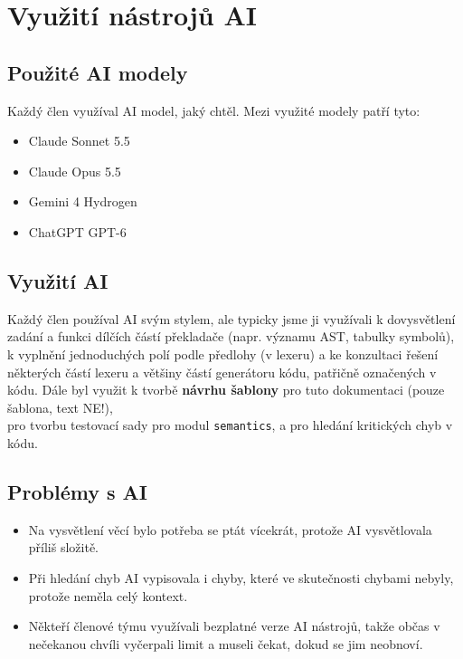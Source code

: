 \documentclass[10pt,a4paper]{article}
\begin{document}
\vspace{0.6cm}

\section{Využití nástrojů AI}

\subsection{Použité AI modely}

Každý člen využíval AI model, jaký chtěl. Mezi využité modely patří tyto:
\begin{itemize}
\item Claude Sonnet 5.5
\item Claude Opus 5.5
\item Gemini 4 Hydrogen
\item ChatGPT GPT-6
\end{itemize}

\subsection{Využití AI}
Každý člen používal AI svým stylem, ale typicky jsme ji využívali k dovysvětlení zadání
a funkci dílčích částí překladače (napr. významu AST, tabulky symbolů),
k vyplnění jednoduchých polí podle předlohy (v lexeru) a ke konzultaci řešení některých
částí lexeru a většiny částí generátoru kódu, patřičně označených v kódu. 
Dále byl využit k tvorbě \textbf{návrhu šablony} pro tuto
dokumentaci (pouze šablona, text NE!), \\ pro tvorbu testovací sady pro modul
\texttt{semantics}, a pro hledání kritických chyb v kódu.

\subsection{Problémy s AI}

\begin{itemize}
\item Na vysvětlení věcí bylo potřeba se ptát vícekrát, protože AI
 vysvětlovala příliš složitě.
\item Při hledání chyb AI vypisovala i chyby, které ve skutečnosti chybami 
nebyly, protože neměla celý kontext.
\item Někteří členové týmu využívali bezplatné verze AI nástrojů, 
takže občas v nečekanou chvíli vyčerpali limit a museli čekat, dokud se jim neobnoví.
\end{itemize}
\end{document}
